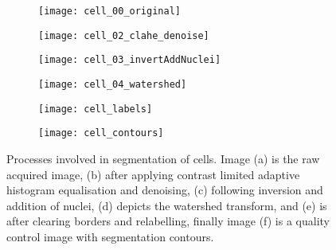 \begin{figure}[htbp]\centering
	\begin{subfigure}[b]{0.45\linewidth} %
		\centering
		\texttt{[image: cell\_00\_original]}
		\caption{}
		\label{figure:image_processing:cell_segmentation:original}
		\vspace{1ex}
	\end{subfigure}
	\begin{subfigure}[b]{0.45\linewidth} %
		\centering
		\texttt{[image: cell\_02\_clahe\_denoise]}
		\caption{}
		\label{figure:image_processing:cell_segmentation:clahe_denoise}
		\vspace{1ex}
	\end{subfigure}
	\begin{subfigure}[b]{0.45\linewidth} %
		\centering
		\texttt{[image: cell\_03\_invertAddNuclei]}
		\caption{}
		\label{figure:image_processing:cell_segmentation:invertAddNuclei}
		\vspace{1ex}
	\end{subfigure}
	\begin{subfigure}[b]{0.45\linewidth} %
		\centering
		\texttt{[image: cell\_04\_watershed]}
		\caption{}
		\label{figure:image_processing:cell_segmentation:watershed}
		\vspace{1ex}
	\end{subfigure}
	\begin{subfigure}[b]{0.45\linewidth} %
		\centering
		\texttt{[image: cell\_labels]}
		\caption{}
		\label{figure:image_processing:cell_segmentation:cell_labels}
		\vspace{1ex}
	\end{subfigure}
	\begin{subfigure}[b]{0.45\linewidth} %
		\centering
		\texttt{[image: cell\_contours]}
		\caption{}
		\label{figure:image_processing:cell_segmentation:contours}
		\vspace{1ex}
	\end{subfigure}
	\vspace{-1ex}
\caption[Cell segmentation]{Processes involved in segmentation of cells. Image (a) is the raw acquired image, (b) after applying contrast limited adaptive histogram equalisation and denoising, (c) following inversion and addition of nuclei, (d) depicts the watershed transform, and (e) is after clearing borders and relabelling, finally image (f) is a quality control image with segmentation contours.}
\label{figure:image_processing:cell_segmentation}
\end{figure}

